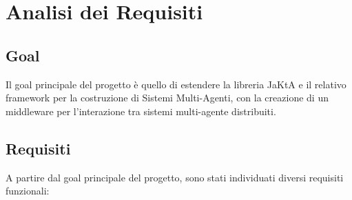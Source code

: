 \section{Analisi dei Requisiti}

%
%

%

\subsection{Goal}

Il goal principale del progetto è quello di estendere la libreria JaKtA e il relativo framework per la costruzione di Sistemi Multi-Agenti,
con la creazione di un middleware per l'interazione tra sistemi multi-agente distribuiti.

\subsection{Requisiti}
A partire dal goal principale del progetto, sono stati individuati diversi requisiti funzionali:

